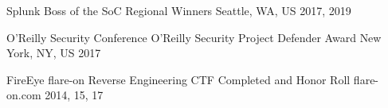 

\begin{cvhonors}

\cvhonor
{Splunk Boss of the SoC} %
{Regional Winners} %
{Seattle, WA, US} %
{2017, 2019} %

\cvhonor
{O'Reilly Security Conference} %
{O'Reilly Security Project Defender Award} %
{New York, NY, US} %
{2017} %

\cvhonor
{FireEye flare-on Reverse Engineering CTF} %
{Completed and Honor Roll} %
{flare-on.com} %
{2014, 15, 17} %


\end{cvhonors}
